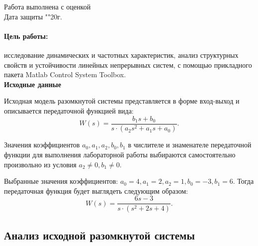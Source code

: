\documentclass[12pt, a4paper]{article}
\begin{document}
\begin{titlepage}
		Работа выполнена с оценкой \hspace{1cm} \underline{\hspace{8cm}} \\ 
		\vspace{1cm}
		Дата защиты "\underline{\hspace{0.7cm}}"\hspace{0.2cm}\underline{\hspace{2cm}}\hspace{0.2cm}20\underline{\hspace{0.7cm}}г.

	\end{titlepage}

\paragraph {Цель работы:} исследование динамических и частотных характеристик, анализ структурных свойств и устойчивости линейных непрерывных систем, с помощью прикладного пакета Matlab Control System Toolbox. \\
\textbf{Исходные данные}
\par 
Исходная модель разомкнутой системы представляется в форме вход-выход и
описывается передаточной функцией вида:
\begin{equation} 
W(s) = \frac{b_1s+b_0}{s\cdot(a_2s^2+a_1s+a_0)}.
\end{equation}

Значения коэффициентов $a_0, a_1, a_2, b_0, b_1$ в числителе и знаменателе передаточной функции для выполнения лабораторной работы выбираются самостоятельно произвольно из условия $a_2\neq0, b_1\neq0$.\par 
Выбранные значения коэффициентов: $a_0=4, a_1=2, a_2=1, b_0=-3, b_1=6$.
Тогда передаточная функция будет выглядеть следующим образом:
\begin{equation} 
W(s) = \frac{6s-3}{s\cdot(s^2+2s+4)}.
\end{equation}

\newpage
\begin{center}
\section{Анализ исходной разомкнутой системы}
\end{center}
\end{document}

